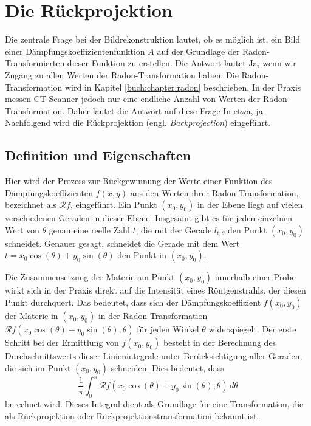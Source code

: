 %
%
%
%
\section{Die Rückprojektion
	\label{ct:section:ruekprojektion}}
Die zentrale Frage bei der Bildrekonstruktion lautet, ob es möglich ist, ein Bild einer Dämpfungskoeffizientenfunktion $A$ auf der Grundlage der Radon-Transformierten dieser Funktion zu erstellen. Die Antwort lautet \glqq Ja\grqq, wenn wir Zugang zu allen Werten der Radon-Transformation haben. Die Radon-Transformation wird in Kapitel \ref{buch:chapter:radon} beschrieben. In der Praxis messen CT-Scanner jedoch nur eine endliche Anzahl von Werten der Radon-Transformation. Daher lautet die Antwort auf diese Frage \glqq In etwa, ja\grqq. Nachfolgend wird die Rückprojektion (engl. \emph{Backprojection}) eingeführt.  

\subsection{Definition und Eigenschaften
	\label{ct:subsection:defnprop}}
Hier wird der Prozess zur Rückgewinnung der Werte einer Funktion des Dämpfungskoeffizienten $f(x, y)$ aus den Werten ihrer Radon-Transformation, bezeichnet als $\mathscr{R}f$, eingeführt. Ein Punkt $(x_0, y_0)$ in der Ebene liegt auf vielen verschiedenen Geraden in dieser Ebene. Insgesamt gibt es für jeden einzelnen Wert von $\theta$ genau eine reelle Zahl $t$, die mit der Gerade $l_{t,\theta}$ den Punkt $(x_0, y_0)$ schneidet. Genauer gesagt, schneidet die Gerade mit dem Wert $t = x_0\cos(\theta) + y_0\sin(\theta)$ den Punkt in $(x_0, y_0)$.  

Die Zusammensetzung der Materie am Punkt $(x_0, y_0)$ innerhalb einer Probe wirkt sich in der Praxis direkt auf die Intensität eines Röntgenstrahls, der diesen Punkt durchquert. Das bedeutet, dass sich der Dämpfungskoeffizient $f(x_0, y_0)$ der Materie in $(x_0, y_0)$ in der Radon-Transformation $\mathscr{R}f(x_0\cos(\theta) + y_0\sin(\theta), \theta)$ für jeden Winkel $\theta$ widerspiegelt. Der erste Schritt bei der Ermittlung von $f(x_0, y_0)$ besteht in der Berechnung des Durchschnittswerts dieser Linienintegrale unter Berücksichtigung aller Geraden, die sich im Punkt $(x_0, y_0)$ schneiden. Dies bedeutet, dass
\begin{equation}
	\dfrac{1}{\pi}\int_{0}^{\pi} \mathscr{R}f(x_0\cos(\theta) + y_0\sin(\theta), \theta) \,d\theta
\end{equation}
berechnet wird. Dieses Integral dient als Grundlage für eine Transformation, die als Rückprojektion oder Rückprojektionstransformation bekannt ist.

